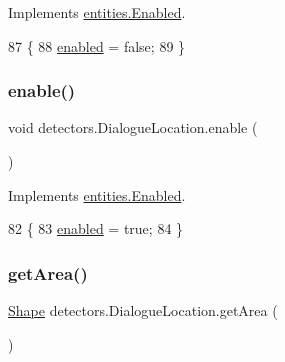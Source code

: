 Implements \mbox{\hyperlink{interfaceentities_1_1_enabled_a1aad7d7176a83876b92f54e2b31fa1e4}{entities.\+Enabled}}.


\begin{DoxyCode}
87                           \{
88         \mbox{\hyperlink{classdetectors_1_1_dialogue_location_a724e4fa1eb635dc794cc3a3fde90e947}{enabled}} = \textcolor{keyword}{false};
89     \}
\end{DoxyCode}
\mbox{\label{classdetectors_1_1_dialogue_location_ae5b1e547c67f1b2f61e3b2b0b5dedbc4}} 
\subsubsection{\texorpdfstring{enable()}{enable()}}
{\footnotesize\ttfamily void detectors.\+Dialogue\+Location.\+enable (\begin{DoxyParamCaption}{ }\end{DoxyParamCaption})\hspace{0.3cm}{\ttfamily [inline]}}



Implements \mbox{\hyperlink{interfaceentities_1_1_enabled_a0c6a44be8f9b87d4e0ddf93dad67232a}{entities.\+Enabled}}.


\begin{DoxyCode}
82                          \{
83         \mbox{\hyperlink{classdetectors_1_1_dialogue_location_a724e4fa1eb635dc794cc3a3fde90e947}{enabled}} = \textcolor{keyword}{true};
84     \}
\end{DoxyCode}
\mbox{\label{classdetectors_1_1_dialogue_location_a3417163c536b0e5ba2b362e9548da7b6}} 
\subsubsection{\texorpdfstring{get\+Area()}{getArea()}}
{\footnotesize\ttfamily \mbox{\hyperlink{classorg_1_1newdawn_1_1slick_1_1geom_1_1_shape}{Shape}} detectors.\+Dialogue\+Location.\+get\+Area (\begin{DoxyParamCaption}{ }\end{DoxyParamCaption})\hspace{0.3cm}{\ttfamily [inline]}}



